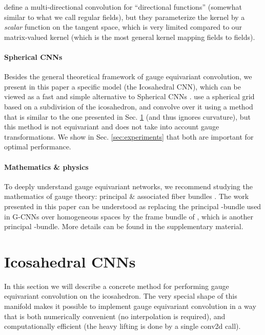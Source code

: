 \documentclass{article}
\begin{document}
\cite{poulenardMultidirectionalGeodesicNeural2018a} define a multi-directional convolution for ``directional functions'' (somewhat similar to what we call regular fields), but they parameterize the kernel by a \emph{scalar} function on the tangent space, which is very limited compared to our matrix-valued kernel (which is the most general kernel mapping  fields to  fields).


\paragraph{Spherical CNNs}
Besides the general theoretical framework of gauge equivariant convolution, we present in this paper a specific model (the Icosahedral CNN), which can be viewed as a fast and simple alternative to Spherical CNNs \cite{cohenSphericalCNNs2018, estevesLearningEquivariantRepresentations2018, boomsmaSphericalConvolutionsTheir2017, suLearningSphericalConvolution2017, perraudinDeepSphereEfficientSpherical2018, jiangSphericalCNNsUnstructured2018, kondorClebschGordanNets2018}.
\citet{liuDeepLearning3D2019} use a spherical grid based on a subdivision of the icosahedron, and convolve over it using a method that is similar to the one presented in Sec. \ref{sec:icosahedral_cnns} (and thus ignores curvature), but this method is not equivariant and does not take into account gauge transformations.
We show in Sec. \ref{sec:experiments} that both are important for optimal performance.


\paragraph{Mathematics \& physics}
To deeply understand gauge equivariant networks, we recommend studying the mathematics of gauge theory: principal \& associated fiber bundles \cite{schullerLecturesGeometricalAnatomy2016, husemollerFibreBundles1994a, steenrodTopologyFibreBundles}.
The work presented in this paper can be understood as replacing the principal -bundle  used in G-CNNs over homogeneous spaces  \cite{cohenGeneralTheoryEquivariant2018} by the frame bundle of , which is another principal -bundle.
More details can be found in the supplementary material.


\section{Icosahedral CNNs}
\label{sec:icosahedral_cnns}

In this section we will describe a concrete method for performing gauge equivariant convolution on the icosahedron.
The very special shape of this manifold makes it possible to implement gauge equivariant convolution in a way that is both numerically convenient (no interpolation is required), and computationally efficient (the heavy lifting is done by a single conv2d call).
\end{document}
